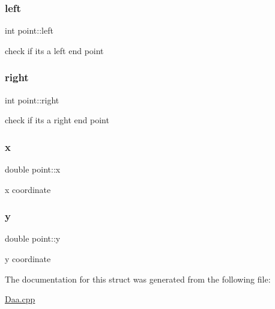 \subsubsection{\texorpdfstring{left}{left}}
{\footnotesize\ttfamily int point\+::left}



check if it\textquotesingle{}s a left end point 

\mbox{\label{structpoint_adbab7dd5bb4d8cbec245104f550f0607}} 
\subsubsection{\texorpdfstring{right}{right}}
{\footnotesize\ttfamily int point\+::right}



check if it\textquotesingle{}s a right end point 

\mbox{\label{structpoint_a9c6b34deaf4900ad4193c17935fd384a}} 
\subsubsection{\texorpdfstring{x}{x}}
{\footnotesize\ttfamily double point\+::x}



x coordinate 

\mbox{\label{structpoint_a613f8f0d7352731638b0094e1b958b87}} 
\subsubsection{\texorpdfstring{y}{y}}
{\footnotesize\ttfamily double point\+::y}



y coordinate 



The documentation for this struct was generated from the following file\+:\begin{DoxyCompactItemize}
\item 
\hyperlink{_daa_8cpp}{Daa.\+cpp}\end{DoxyCompactItemize}

